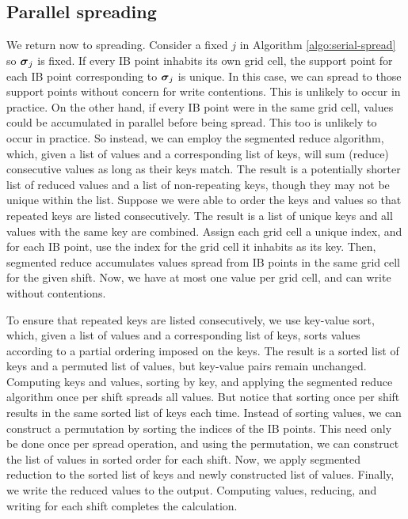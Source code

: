 \subsection{Parallel spreading}

We return now to spreading. Consider a fixed $j$ in Algorithm \ref{algo:serial-spread}
so $\boldsymbol{\sigma}_j$ is fixed. If every IB point inhabits its own grid cell, the support point
for each IB point corresponding to $\boldsymbol{\sigma}_j$ is unique. In this case, we can spread to
those support points without concern for write contentions. This is unlikely to occur in
practice. On the other hand, if every IB point were in the same grid cell, values could
be accumulated in parallel before being spread. This too is unlikely to occur in
practice. So instead, we can employ the segmented reduce algorithm, which, given a list
of values and a corresponding list of keys, will sum (reduce) consecutive values as long
as their keys match. The result is a potentially shorter list of reduced values and a
list of non-repeating keys, though they may not be unique within the list. Suppose we
were able to order the keys and values so that repeated keys are listed consecutively.
The result is a list of unique keys and all values with the same key are combined. Assign
each grid cell a unique index, and for each IB point, use the index for the grid cell it
inhabits as its key. Then, segmented reduce accumulates values spread from IB points in
the same grid cell for the given shift. Now, we have at most one value per grid cell, and
can write without contentions.

To ensure that repeated keys are listed consecutively, we use key-value sort, which,
given a list of values and a corresponding list of keys, sorts values according to a
partial ordering imposed on the keys. The result is a sorted list of keys and a permuted
list of values, but key-value pairs remain unchanged. Computing keys and values, sorting
by key, and applying the segmented reduce algorithm once per shift spreads all values.
But notice that sorting once per shift results in the same sorted list of keys each time.
Instead of sorting values, we can construct a permutation by sorting the indices of the
IB points. This need only be done once per spread operation, and using the permutation,
we can construct the list of values in sorted order for each shift. Now, we apply
segmented reduction to the sorted list of keys and newly constructed list of values.
Finally, we write the reduced values to the output. Computing values, reducing, and
writing for each shift completes the calculation.

